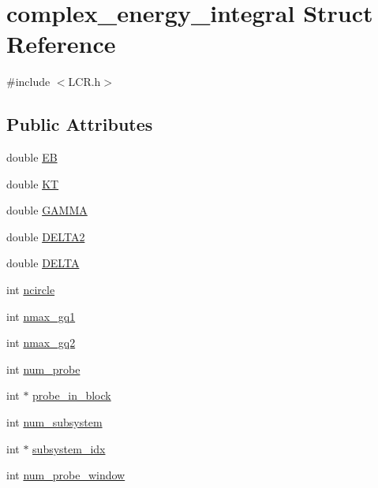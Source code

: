 \hypertarget{structcomplex__energy__integral}{\section{complex\-\_\-energy\-\_\-integral Struct Reference}
\label{structcomplex__energy__integral}
}


{\ttfamily \#include $<$L\-C\-R.\-h$>$}

\subsection*{Public Attributes}
\begin{DoxyCompactItemize}
\item 
double \hyperlink{structcomplex__energy__integral_afe34858cd863402c594f3fb7b91d0548}{E\-B}
\item 
double \hyperlink{structcomplex__energy__integral_a6744f2f16d07c1d4b661fabea6cc0139}{K\-T}
\item 
double \hyperlink{structcomplex__energy__integral_aede903921e8dc8c0407a8f85eba4c420}{G\-A\-M\-M\-A}
\item 
double \hyperlink{structcomplex__energy__integral_a55f15a6ac8439c0f685758360cc431bf}{D\-E\-L\-T\-A2}
\item 
double \hyperlink{structcomplex__energy__integral_a0f1e45106d0365db53743df736108e4e}{D\-E\-L\-T\-A}
\item 
int \hyperlink{structcomplex__energy__integral_a5fa20c6efd7fe8df508fa019c863e440}{ncircle}
\item 
int \hyperlink{structcomplex__energy__integral_a8006515974fc36c94894f4f98c1cc1d4}{nmax\-\_\-gq1}
\item 
int \hyperlink{structcomplex__energy__integral_ac73434e111d91222479b0343a3860c25}{nmax\-\_\-gq2}
\item 
int \hyperlink{structcomplex__energy__integral_a7ad789b23c1db1b0d2f2710dbc0cc47b}{num\-\_\-probe}
\item 
int $\ast$ \hyperlink{structcomplex__energy__integral_a00b92090e386aa6c9872aa6efcd95503}{probe\-\_\-in\-\_\-block}
\item 
int \hyperlink{structcomplex__energy__integral_a74624c1cc966a64135766855e1c483b1}{num\-\_\-subsystem}
\item 
int $\ast$ \hyperlink{structcomplex__energy__integral_a42ffc2d38bbc333454bccf47a207e0ec}{subsystem\-\_\-idx}
\item 
int \hyperlink{structcomplex__energy__integral_a8f69a6d61ac6d2700079f083c0519ca4}{num\-\_\-probe\-\_\-window}

\end{DoxyCompactItemize}
